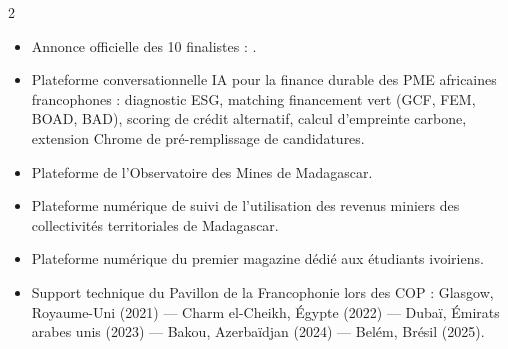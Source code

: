 \documentclass[10pt,a4paper,ragged2e,withhyper]{altacv}
\begin{document}
\begin{paracol}{2}
            \begin{itemize}
                \item Annonce officielle des 10 finalistes : .
                \item Plateforme conversationnelle IA pour la finance durable des PME africaines francophones : diagnostic ESG, matching financement vert (GCF, FEM, BOAD, BAD), scoring de crédit alternatif, calcul d'empreinte carbone, extension Chrome de pré-remplissage de candidatures.
            \end{itemize}
            \divider

            \begin{itemize}
                \item Plateforme de l'Observatoire des Mines de Madagascar.
            \end{itemize}
            \divider

            \newpage

            \begin{itemize}
                \item Plateforme numérique de suivi de l'utilisation des revenus miniers des collectivités territoriales de Madagascar.
            \end{itemize}
            \divider

            \begin{itemize}
                \item Plateforme numérique du premier magazine dédié aux étudiants ivoiriens.
            \end{itemize}


            \begin{itemize}
                \item Support technique du Pavillon de la Francophonie lors des COP : Glasgow, Royaume-Uni (2021) — Charm el-Cheikh, Égypte (2022) — Dubaï, Émirats arabes unis (2023) — Bakou, Azerbaïdjan (2024) — Belém, Brésil (2025).
            \end{itemize}
            \divider


\end{paracol}
\end{document}
